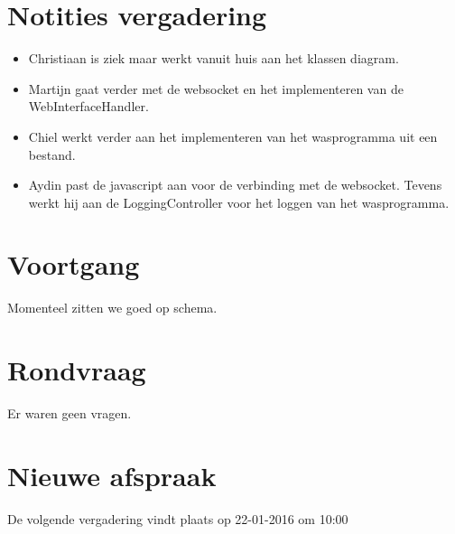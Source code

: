 \documentclass[dutch]{hu}
\begin{document}
\section{Notities vergadering}
\begin{itemize}

\item Christiaan is ziek maar werkt vanuit huis aan het klassen diagram.
\item Martijn gaat verder met de websocket en het implementeren van de WebInterfaceHandler.
\item Chiel werkt verder aan het implementeren van het wasprogramma uit een bestand.
\item Aydin past de javascript aan voor de verbinding met de websocket. Tevens werkt hij aan de LoggingController voor het loggen van het wasprogramma.

\end{itemize}

\section{Voortgang}
Momenteel zitten we goed op schema.

\section{Rondvraag}
Er waren geen vragen.

\section{Nieuwe afspraak}
De volgende vergadering vindt plaats op 22-01-2016 om 10:00
\end{document}
